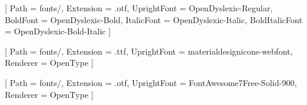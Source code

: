 \usepackage{iftex}
\ifluatex
\usepackage{fontspec}
\ifdefined\opendys 
 	\setmainfont{OpenDyslexic-Regular}[
    		Path = fonts/,  %
    		Extension = .otf,  %
    		UprightFont = OpenDyslexic-Regular,  %
    		BoldFont = OpenDyslexic-Bold,
    		ItalicFont = OpenDyslexic-Italic,
    		BoldItalicFont = OpenDyslexic-Bold-Italic
	]
	\ifdefined\glstextformat
		\renewcommand*{\glstextformat}[1]{\textbf{\fontspec{OpenDyslexic-Regular}[
    		Path = fonts/,  %
    		Extension = .otf,  %
    		UprightFont = OpenDyslexic-Regular,  %
    		BoldFont = OpenDyslexic-Bold,
    		ItalicFont = OpenDyslexic-Italic,
    		BoldItalicFont = OpenDyslexic-Bold-Italic
		]#1}}
	\fi
\fi	

\newfontfamily{}[
  Path = fonts/,
  Extension = .ttf,
  UprightFont = materialdesignicons-webfont,
  Renderer = OpenType
]
\DeclareTextFontCommand{\mdi}{\MaterialDesignIcons}

\newfontfamily{}[
  Path = fonts/,
  Extension = .otf,
  UprightFont = FontAwesome7Free-Solid-900,
  Renderer = OpenType
]
\DeclareTextFontCommand{\fawsome}{\FontAwsome}
\fi

\newcommand{\mdiAirBalloon}{\Huge\ifluatex\mdi{ ^^^^^^0f001c }\else\faQuestion\fi\normalsize}
\newcommand{\mdiParachute}{\Huge\ifluatex\mdi{ ^^^^^^0f0cb4 }\else\faQuestion\fi\normalsize}
\newcommand{\mdiRocket}{\Huge\ifluatex\mdi{ ^^^^^^0f14de }\else\faRocket\fi\normalsize}
\newcommand{\mdiBrevet}{\Huge\ifluatex\mdi{ ^^^^^^0f1188 }\else\faCertificate\fi\normalsize}
\newcommand{\mdiTrophy}{\Huge\ifluatex\mdi{ ^^^^^^0f0538 }\else\faTrophy\fi\normalsize}
\newcommand{\mdiMilitaire}{\Huge\ifluatex\mdi{ ^^^^^^0f0787 }\else\faShield\fi\normalsize}
\newcommand{\mdiFemale}{\Huge\ifluatex\mdi{ ^^^^^^0f029c }\else\faFemale\fi\normalsize}
\newcommand{\mdiGreen}{\Huge\ifluatex\mdi{ ^^^^^^0f032a }\else\faLeaf\fi\normalsize}
\newcommand{\mdiSpaceStation}{\Huge\ifluatex\mdi{ ^^^^^^0f1383 }\else\faQuestion\fi\normalsize}

\newcommand{\fawsomeIcon}[2]{\ifluatex
  \begingroup
  \sbox0{#2}%
  \makebox[\wd0][c]{\raisebox{0pt}[\ht0][\dp0]{\fawsome{\symbol{#1}}}}%
  \endgroup
\else#2\fi}
\newcommand{\fawsomeQuestion}{\fawsomeIcon{"F059}{\faQuestionCircle}}
\newcommand{\fawsomeAlerte}{\fawsomeIcon{"F06A}{\faExclamationCircle}}
\newcommand{\fawsomeInfo}{\fawsomeIcon{"F05A}{\faInfoCircle}}
\newcommand{\fawsomeHistoire}{\fawsomeIcon{"F02D}{\faBook}}
\newcommand{\fawsomeAstuce}{\fawsomeIcon{"F0EB}{\faLightbulb}}
\newcommand{\fawsomeExemple}{\fawsomeIcon{"F002}{\faSearch}}
\newcommand{\fawsomeDefinition}{\fawsomeIcon{"F013}{\faCog}}
\newcommand{\fawsomeQuestionSimple}{\fawsomeIcon{"F128}{\faQuestion}}
\newcommand{\fawsomeIa}{\fawsomeIcon{"F544}{\faRobot}}
